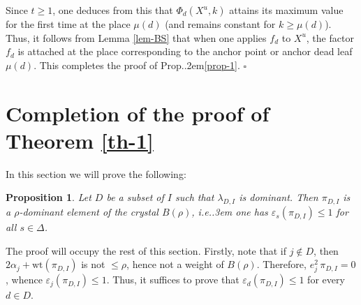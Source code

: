 \documentclass[12pt]{amsart}
\numberwithin{equation}{section}
\newtheorem{prop}[thm]{Proposition}
\theoremstyle{definition}
\def\Prop{Prop.\kern.2em}
\def\ie{{i.e.}\kern.3em}
\def\wt{\mathrm{wt}}  %
\let\vep\varepsilon
\begin{document}
Since $t\geq 1$, one deduces from this that $\Phi_d(X^u,k)$ attains its maximum value  for the first time at the place 
$\mu(d)$ (and remains constant for $k\geq \mu(d)$). Thus,  
it follows from Lemma \ref{lem-BS} that when one applies 
$f_d$ to $X^u$, the factor $f_d$ is attached at the place corresponding to 
 the anchor point or anchor dead leaf $\mu(d)$. This completes the proof of \Prop \ref{prop-1}.  
 \hfill $\square$



\section{Completion of the proof of Theorem \ref{th-1}} 

In this section we will prove the following: 

\begin{prop}\label{prop-2} Let $D$ be a subset of $I$ such that $\lambda_{D,I}$ is dominant. 
Then $\pi_{D,I}$ is a $\rho$-dominant element of the crystal $B(\rho)$, \ie 
one has $\vep_s(\pi_{D,I}) \leq 1$ for all $s\in \Delta$.
\end{prop} 

The proof will occupy the rest of this section. 
Firstly, note that if $j\not\in D$, then $2\alpha_j + \wt(\pi_{D, I})$ is not $\leq \rho$, hence not a weight of $B(\rho)$. Therefore, $e_j^2 \, \pi_{D,I} = 0$, whence $\vep_j(\pi_{D, I}) \leq 1$. Thus, it suffices to prove that $\vep_d(\pi_{D, I}) \leq 1$ for every $d\in D$. 
\end{document}
